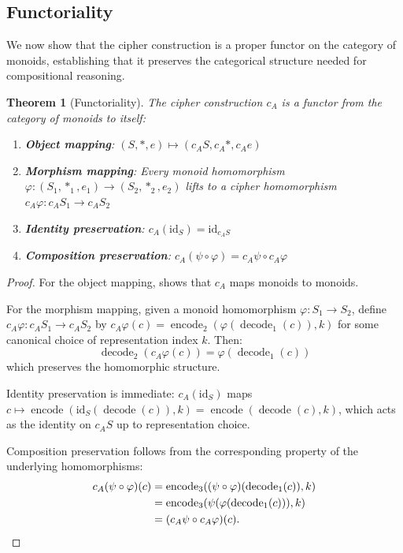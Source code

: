 \documentclass[11pt]{article}
\theoremstyle{definition}
\theoremstyle{plain}
\newtheorem{theorem}{Theorem}[section]
\theoremstyle{remark}
\newcommand{\cipher}[1]{c_{#1}}
\newcommand{\encode}{\operatorname{encode}}
\newcommand{\decode}{\operatorname{decode}}
\begin{document}
\subsection{Functoriality}

We now show that the cipher construction is a proper functor on the category of monoids, establishing that it preserves the categorical structure needed for compositional reasoning.

\begin{theorem}[Functoriality]
\label{thm:functoriality}
The cipher construction $\cipher{A}$ is a functor from the category of monoids to itself:
\begin{enumerate}
\item \textbf{Object mapping}: $(S, *, e) \mapsto (\cipher{A}S, \cipher{A}*, \cipher{A}e)$
\item \textbf{Morphism mapping}: Every monoid homomorphism $\varphi: (S_1, *_1, e_1) \to (S_2, *_2, e_2)$ lifts to a cipher homomorphism $\cipher{A}\varphi: \cipher{A}S_1 \to \cipher{A}S_2$
\item \textbf{Identity preservation}: $\cipher{A}(\mathrm{id}_S) = \mathrm{id}_{\cipher{A}S}$
\item \textbf{Composition preservation}: $\cipher{A}(\psi \circ \varphi) = \cipher{A}\psi \circ \cipher{A}\varphi$
\end{enumerate}
\end{theorem}

\begin{proof}
For the object mapping,  shows that $\cipher{A}$ maps monoids to monoids.

For the morphism mapping, given a monoid homomorphism $\varphi: S_1 \to S_2$, define $\cipher{A}\varphi: \cipher{A}S_1 \to \cipher{A}S_2$ by $\cipher{A}\varphi(c) = \encode_2(\varphi(\decode_1(c)), k)$ for some canonical choice of representation index $k$. Then:
$$\decode_2(\cipher{A}\varphi(c)) = \varphi(\decode_1(c))$$
which preserves the homomorphic structure.

Identity preservation is immediate: $\cipher{A}(\mathrm{id}_S)$ maps $c \mapsto \encode(\mathrm{id}_S(\decode(c)), k) = \encode(\decode(c), k)$, which acts as the identity on $\cipher{A}S$ up to representation choice.

Composition preservation follows from the corresponding property of the underlying homomorphisms:
\begin{align*}
\cipher{A}(\psi \circ \varphi)(c) &= \encode_3((\psi \circ \varphi)(\decode_1(c)), k)\\
&= \encode_3(\psi(\varphi(\decode_1(c))), k)\\
&= (\cipher{A}\psi \circ \cipher{A}\varphi)(c). \qedhere
\end{align*}
\end{proof}
\end{document}
